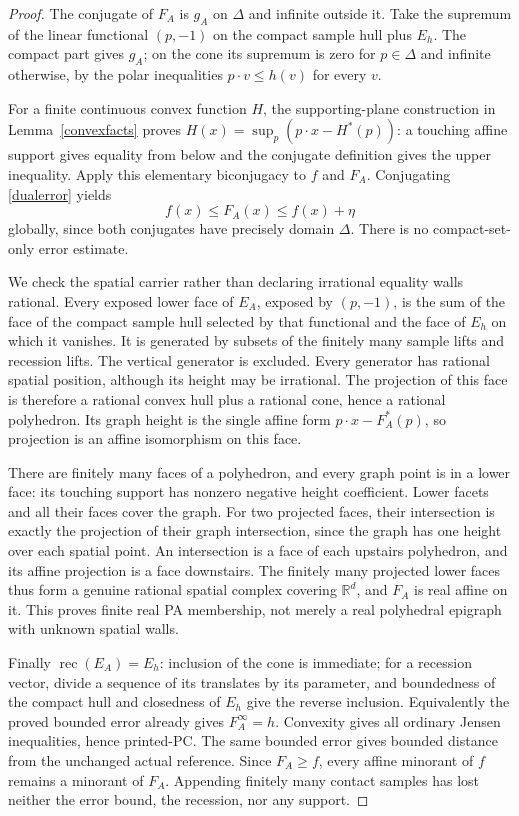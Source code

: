 \documentclass[11pt]{article}
\newcommand{\R}{\mathbb R}
\newcommand{\rec}{\operatorname{rec}}
\begin{document}
\begin{proof}
The conjugate of $F_A$ is $g_A$ on $\Delta$ and infinite outside it. Take the supremum of the linear functional $(p,-1)$ on the compact sample hull plus $E_h$. The compact part gives $g_A$; on the cone its supremum is zero for $p\in\Delta$ and infinite otherwise, by the polar inequalities $p\cdot v\leq h(v)$ for every $v$.

For a finite continuous convex function $H$, the supporting-plane construction in Lemma~\ref{convexfacts} proves
$H(x)=\sup_p(p\cdot x-H^*(p))$: a touching affine support gives equality from below and the conjugate definition gives the upper inequality. Apply this elementary biconjugacy to $f$ and $F_A$. Conjugating \eqref{dualerror} yields
\[
 f(x)\leq F_A(x)\leq f(x)+\eta
\]
globally, since both conjugates have precisely domain $\Delta$. There is no compact-set-only error estimate.

We check the spatial carrier rather than declaring irrational equality walls rational. Every exposed lower face of $E_A$, exposed by $(p,-1)$, is the sum of the face of the compact sample hull selected by that functional and the face of $E_h$ on which it vanishes. It is generated by subsets of the finitely many sample lifts and recession lifts. The vertical generator is excluded. Every generator has rational spatial position, although its height may be irrational. The projection of this face is therefore a rational convex hull plus a rational cone, hence a rational polyhedron. Its graph height is the single affine form $p\cdot x-F_A^*(p)$, so projection is an affine isomorphism on this face.

There are finitely many faces of a polyhedron, and every graph point is in a lower face: its touching support has nonzero negative height coefficient. Lower facets and all their faces cover the graph. For two projected faces, their intersection is exactly the projection of their graph intersection, since the graph has one height over each spatial point. An intersection is a face of each upstairs polyhedron, and its affine projection is a face downstairs. The finitely many projected lower faces thus form a genuine rational spatial complex covering $\R^d$, and $F_A$ is real affine on it. This proves finite real PA membership, not merely a real polyhedral epigraph with unknown spatial walls.

Finally $\rec(E_A)=E_h$: inclusion of the cone is immediate; for a recession vector, divide a sequence of its translates by its parameter, and boundedness of the compact hull and closedness of $E_h$ give the reverse inclusion. Equivalently the proved bounded error already gives $F_A^\infty=h$. Convexity gives all ordinary Jensen inequalities, hence printed-PC. The same bounded error gives bounded distance from the unchanged actual reference. Since $F_A\geq f$, every affine minorant of $f$ remains a minorant of $F_A$. Appending finitely many contact samples has lost neither the error bound, the recession, nor any support.
\end{proof}
\end{document}
